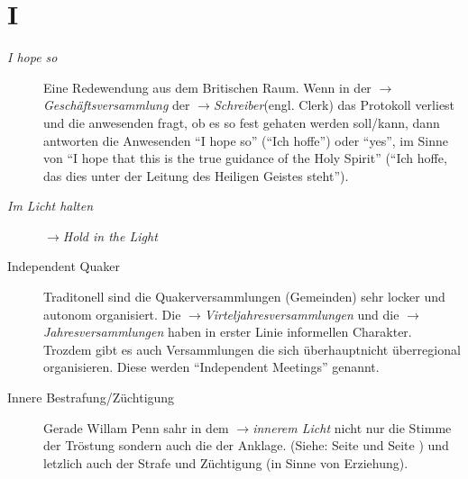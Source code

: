 \section*{I}

\articlesize

\begin{description}

\item[\textit{I hope so}] Eine Redewendung aus dem Britischen Raum. Wenn in der
$\to$\textit{Geschäftsversammlung} der $\to$\textit{Schreiber}(engl. Clerk) das
Protokoll verliest und die anwesenden fragt, ob es so fest gehaten werden
soll/kann, dann antworten die Anwesenden "`I hope so"' ("`Ich hoffe"') oder
"`yes"', im Sinne von "`I hope that this is the true guidance of the Holy
Spirit"' ("`Ich hoffe, das dies unter der Leitung des Heiligen Geistes steht"').

\item[\textit{Im Licht halten}] $\to$\textit{Hold in the Light}

\item[Independent Quaker] Traditonell sind die Quakerversammlungen (Gemeinden)
sehr locker und autonom organisiert. Die $\to$\textit{Virteljahresversammlungen}
und die $\to$\textit{Jahresversammlungen} haben in erster Linie informellen
Charakter. Trozdem gibt es auch Versammlungen die sich überhauptnicht
überregional organisieren. Diese werden "`Independent Meetings"' genannt. 


 \item[Innere Bestrafung/Züchtigung] Gerade Willam Penn sahr in dem
 $\to$\textit{innerem Licht} nicht nur die Stimme der Tröstung sondern auch die
 der Anklage. (Siehe: Seite \pageref{kap10_ab10} und
 Seite \pageref{kap14_ab1}) und letzlich auch der Strafe und Züchtigung (in Sinne
 von Erziehung).
 

\end{description}
